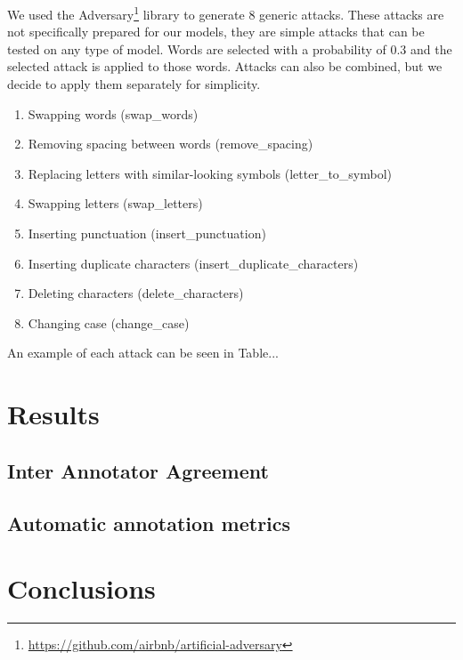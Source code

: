 \documentclass[11pt,a4paper]{article}
\begin{document}
We used the Adversary\footnote{\url{https://github.com/airbnb/artificial-adversary}} library to generate 8 generic attacks. These attacks are not specifically prepared for our models, they are simple attacks that can be tested on any type of model. Words are selected with a probability of 0.3 and the selected attack is applied to those words. Attacks can also be combined, but we decide to apply them separately for simplicity.

\begin{enumerate}
    \item Swapping words (swap\_words)
    \item Removing spacing between words (remove\_spacing)
    \item Replacing letters with similar-looking symbols (letter\_to\_symbol)
    \item Swapping letters (swap\_letters)
    \item Inserting punctuation (insert\_punctuation)
    \item Inserting duplicate characters (insert\_duplicate\_characters)
    \item Deleting characters (delete\_characters)
    \item Changing case (change\_case)
\end{enumerate}

An example of each attack can be seen in Table...

\section{Results}

\subsection{Inter Annotator Agreement}

\subsection{Automatic annotation metrics}

\section{Conclusions}



\end{document}
